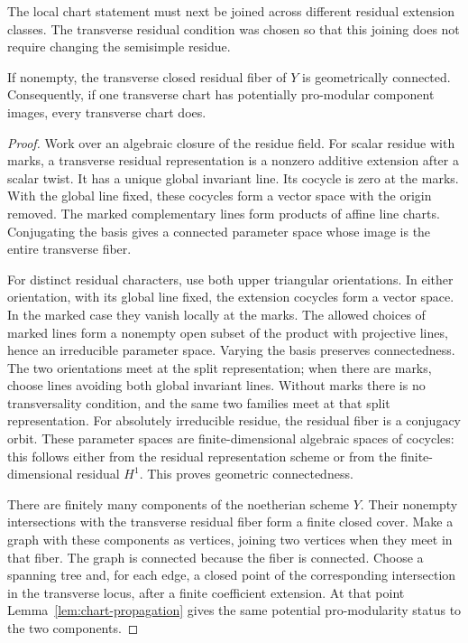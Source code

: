 The local chart statement must next be joined across
different residual extension classes. The transverse
residual condition was chosen so that this joining
does not require changing the semisimple residue.

\begin{lemma}\label{lem:transverse-fiber}
If nonempty, the transverse closed residual fiber
of \(Y\) is geometrically connected. Consequently,
if one transverse chart has potentially pro-modular
component images, every transverse chart does.
\end{lemma}
\begin{proof}
Work over an algebraic closure of the residue field.
For scalar residue with marks, a transverse residual
representation is a nonzero additive extension after
a scalar twist. It has a unique global invariant line.
Its cocycle is zero at the marks. With the global
line fixed, these cocycles form a vector space with
the origin removed. The marked complementary lines
form products of affine line charts. Conjugating
the basis gives a connected parameter space whose
image is the entire transverse fiber.

For distinct residual characters, use both upper
triangular orientations. In either orientation,
with its global line fixed, the extension cocycles
form a vector space. In the marked case they
vanish locally at the marks. The allowed choices
of marked lines form a nonempty open subset of
the product with projective lines, hence an
irreducible parameter space. Varying the basis
preserves connectedness. The two orientations
meet at the split representation; when there
are marks, choose lines avoiding both global
invariant lines. Without marks there is no
transversality condition, and the same two
families meet at that split representation.
For absolutely irreducible residue, the
residual fiber is a conjugacy orbit.
These parameter spaces are finite-dimensional
algebraic spaces of cocycles: this follows either
from the residual representation scheme or from
the finite-dimensional residual \(H^1\).
This proves geometric connectedness.

There are finitely many components of the noetherian
scheme \(Y\). Their nonempty intersections with the
transverse residual fiber form a finite closed cover.
Make a graph with these components as vertices, joining
two vertices when they meet in that fiber. The graph
is connected because the fiber is connected.
Choose a spanning tree and, for each edge, a closed point
of the corresponding intersection in the transverse locus,
after a finite coefficient extension. At that point
Lemma~\ref{lem:chart-propagation} gives the same potential
pro-modularity status to the two components.


\end{proof}
